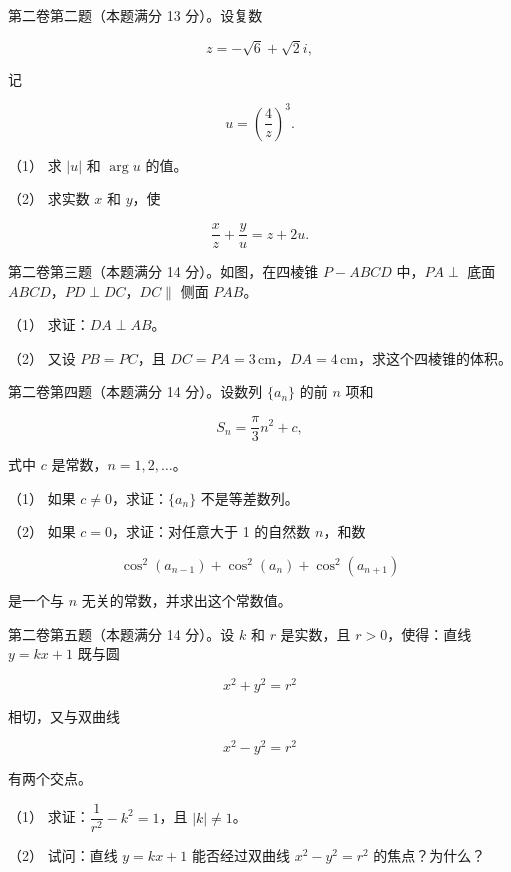 \begin{question}

第二卷第二题（本题满分 13 分）。设复数

\nopagebreak[4]
\[
z=-\sqrt6+\sqrt2i,
\]

记

\nopagebreak[4]
\[
u=\left(\frac4z\right)^3.
\]

（1） 求 $|u|$ 和 $\arg u$ 的值。

（2） 求实数 $x$ 和 $y$，使

\nopagebreak[4]
\[
\frac{x}{z}+\frac{y}{u}=z+2u.
\]

\Needspace{0.4\textheight}
\end{question}
\begin{question}

第二卷第三题（本题满分 14 分）。如图，在四棱锥 $P-ABCD$ 中，$PA\perp$ 底面 $ABCD$，$PD\perp DC$，$DC\parallel$ 侧面 $PAB$。
\nopagebreak[4]
\begin{center}\end{center}
\nopagebreak[4]
（1） 求证：$DA\perp AB$。

（2） 又设 $PB=PC$，且 $DC=PA=3\,\mathrm{cm}$，$DA=4\,\mathrm{cm}$，求这个四棱锥的体积。

\end{question}
\begin{question}

第二卷第四题（本题满分 14 分）。设数列 $\{a_n\}$ 的前 $n$ 项和

\nopagebreak[4]
\[
S_n=\frac\pi3n^2+c,
\]

式中 $c$ 是常数，$n=1,2,\ldots$。

（1） 如果 $c\ne0$，求证：$\{a_n\}$ 不是等差数列。

（2） 如果 $c=0$，求证：对任意大于 1 的自然数 $n$，和数

\nopagebreak[4]
\[
\cos^2(a_{n-1})+\cos^2(a_n)+\cos^2(a_{n+1})
\]

是一个与 $n$ 无关的常数，并求出这个常数值。

\end{question}
\begin{question}

第二卷第五题（本题满分 14 分）。设 $k$ 和 $r$ 是实数，且 $r>0$，使得：直线 $y=kx+1$ 既与圆

\nopagebreak[4]
\[
x^2+y^2=r^2
\]

相切，又与双曲线

\nopagebreak[4]
\[
x^2-y^2=r^2
\]

有两个交点。

（1） 求证：$\dfrac1{r^2}-k^2=1$，且 $|k|\ne1$。

（2） 试问：直线 $y=kx+1$ 能否经过双曲线 $x^2-y^2=r^2$ 的焦点？为什么？

\end{question}